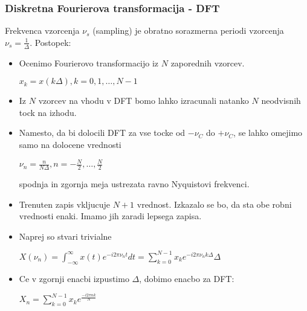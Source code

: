 \documentclass{article}
\begin{document}
\begin{multicols}{4}
\subsubsection{Diskretna Fourierova transformacija - DFT}
Frekvenca vzorcenja $\nu_s $ (sampling) je obratno sorazmerna periodi vzorcenja $\nu_s = \frac{1}{\Delta}$.
Postopek:
\begin{itemize}
    \item Ocenimo Fourierovo transformacijo iz $N$ zaporednih vzorcev.
        \begin{center}
            \begin{math}
                x_k = x(k \Delta), k = 0,1, \dots, N - 1
            \end{math}
        \end{center}
    \item Iz $N$ vzorcev na vhodu v DFT bomo lahko izracunali natanko $N$ neodvisnih tock na izhodu.
    \item Namesto, da bi dolocili DFT za vse tocke od $- \nu_C$ do $+ \nu_C$, se lahko omejimo samo 
        na dolocene vrednosti
        \begin{center}
            \begin{math}
                \nu_n = \frac{n}{N \Delta}, n = - \frac{N}{2}, \dots, \frac{N}{2}
            \end{math}
        \end{center}
        spodnja in zgornja meja ustrezata ravno Nyquistovi frekvenci.
    \item Trenuten zapis vkljucuje $N + 1$ vrednost. Izkazalo se bo, da sta obe robni vrednosti enaki. Imamo
        jih zaradi lepsega zapisa.
    \item Naprej so stvari trivialne
        \begin{center}
            \begin{math}
                X(\nu_n) = \int_{-\infty}^{\infty} x(t) e^{-i2 \pi \nu_n t} dt = \sum^{N-1}_{k=0} x_k e^{-i2 \pi \nu_n k \Delta} \Delta
            \end{math}
        \end{center}
    \item Ce v zgornji enacbi izpustimo $\Delta$, dobimo enacbo za DFT:
        \begin{center}
            \begin{math}
                X_n = \sum_{k=0}^{N-1} x_k e^{\frac{-i2 \pi n k}{N}}
            \end{math}
        \end{center}
\end{itemize}


\end{multicols}
\end{document}
